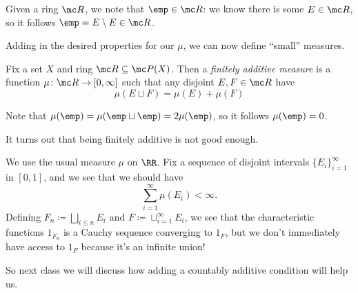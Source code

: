 \documentclass[../notes.tex]{subfiles}
\begin{document}
\begin{remark}
	Given a ring $\mc R$, we note that $\emp\in\mc R$: we know there is some $E\in\mc R$, so it follows $\emp=E\setminus E\in\mc R$.
\end{remark}
Adding in the desired properties for our $\mu$, we can now define ``small'' measures.
\begin{definition}
	Fix a set $X$ and ring $\mc R\subseteq\mc P(X)$. Then a \textit{finitely additive measure} is a function $\mu\colon\mc R\to[0,\infty]$ such that any disjoint $E,F\in\mc R$ have
	\[\mu(E\sqcup F)=\mu(E)+\mu(F)\]
\end{definition}
\begin{remark}
	Note that $\mu(\emp)=\mu(\emp\sqcup\emp)=2\mu(\emp)$, so it follows $\mu(\emp)=0$.
\end{remark}
It turns out that being finitely additive is not good enough.
\begin{example} \label{ex:want-countable-union}
	We use the usual measure $\mu$ on $\RR$. Fix a sequence of disjoint intervals $\{E_i\}_{i=1}^\infty$ in $[0,1]$, and we see that we should have
	\[\sum_{i=1}^\infty\mu(E_i)<\infty.\]
	Defining $F_n\coloneqq\bigsqcup_{i\le n}E_i$ and $F\coloneqq\sqcup_{i=1}^\infty E_i$, we see that the characteristic functions $1_{F_n}$ is a Cauchy sequence converging to $1_F$, but we don't immediately have access to $1_F$ because it's an infinite union!
\end{example}
So next class we will discuss how adding a countably additive condition will help us.
\end{document}
